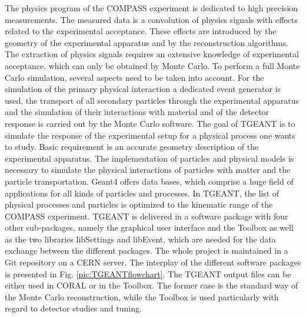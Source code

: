 The physics program of the COMPASS experiment is dedicated to high precision measurements. The measured data is a convolution of physics signals with effects related to the experimental acceptance. These effects are introduced by the geometry of the experimental apparatus and by the reconstruction algorithms. The extraction of physics signals requires an extensive knowledge of experimental acceptance, which can only be obtained by Monte Carlo.
To perform a full Monte Carlo simulation, several aspects need to be taken into account. For the simulation of the primary physical interaction a dedicated event generator is used, the transport of all secondary particles through the experimental apparatus and the simulation of their interactions with material and of the detector response is carried out by the Monte Carlo software.
The goal of TGEANT is to simulate the response of the experimental setup for a physical process one wants to study. Basic requirement is an accurate geometry description of the experimental apparatus. The implementation of particles and physical models is necessary to simulate the physical interactions of particles with matter and the particle transportation. Geant4 offers data bases, which comprise a huge field of applications for all kinds of particles and processes. In TGEANT, the list of physical processes and particles is optimized to the kinematic range of the COMPASS experiment.
TGEANT is delivered in a software package with four other sub-packages, namely the graphical user interface and the Toolbox as well as the two libraries libSettings and libEvent, which are needed for the data exchange between the different packages. The whole project is maintained in a Git repository on a CERN server. The interplay of the different software packages is presented in Fig. \ref{pic:TGEANTflowchart}. The TGEANT output files can be either used in CORAL or in the Toolbox. The former case is the standard way of the Monte Carlo reconstruction, while the Toolbox is used particularly with regard to detector studies and tuning.

